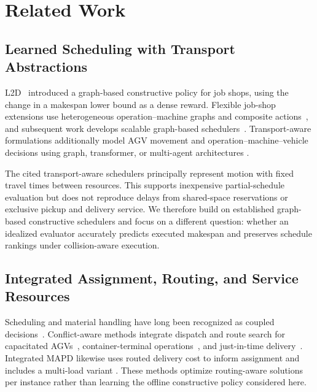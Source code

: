 
\section{Related Work}
\label{sec:related}

\subsection{Learned Scheduling with Transport Abstractions}

L2D~\cite{zhang2020l2d} introduced a graph-based constructive policy for job
shops, using the change in a makespan lower bound as a dense reward. Flexible
job-shop extensions use heterogeneous operation--machine graphs and composite
actions~\cite{song2023fjsp}, and subsequent work develops scalable graph-based
schedulers~\cite{moon2024hgs}. Transport-aware formulations additionally model
AGV movement and operation--machine--vehicle decisions using graph,
transformer, or multi-agent architectures
\cite{yuan2026gin,yang2026cosched,matrans2026}.

The cited transport-aware schedulers principally represent motion with fixed
travel times between resources. This supports inexpensive partial-schedule
evaluation but does not reproduce delays from shared-space reservations or
exclusive pickup and delivery service. We therefore build on established 
graph-based constructive schedulers and focus on a different question: whether 
an idealized evaluator accurately predicts executed makespan and preserves 
schedule rankings under collision-aware execution.

\subsection{Integrated Assignment, Routing, and Service Resources}

Scheduling and material handling have long been recognized as coupled
decisions~\cite{bilge1995time,ulusoy1997ga}. Conflict-aware methods integrate
dispatch and route search for capacitated AGVs~\cite{miyamoto2016local},
container-terminal operations~\cite{zhong2020integrated}, and just-in-time
delivery~\cite{nishida2023jit}. Integrated MAPD likewise uses routed delivery
cost to inform assignment and includes a multi-load variant
\cite{chen2021integrated}. These methods optimize routing-aware solutions per
instance rather than learning the offline constructive policy considered here.

